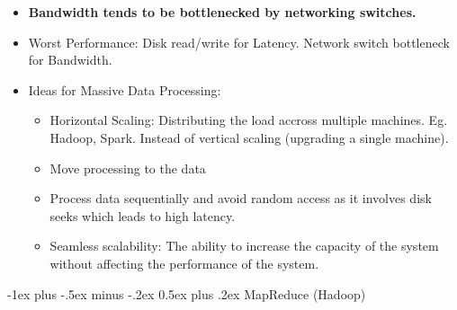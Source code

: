\documentclass[10pt, landscape]{article}
\makeatletter
\renewcommand{\section}{\@startsection{section}{1}{0mm}%
  {-1ex plus -.5ex minus -.2ex}%
  {0.5ex plus .2ex}%
{\normalfont\large\bfseries}}
\makeatother
\begin{document}
\begin{multicols*}{4}
\begin{itemize}
    \item \textbf{Bandwidth tends to be bottlenecked by networking switches.}
    \item Worst Performance: Disk read/write for Latency. Network switch bottleneck for Bandwidth.
    \item Ideas for Massive Data Processing:
    \begin{itemize}
      \item Horizontal Scaling: Distributing the load accross multiple machines. Eg. Hadoop, Spark. Instead of vertical scaling (upgrading a single machine).
      \item Move processing to the data
      \item Process data sequentially and avoid random access as it involves disk seeks which leads to high latency.
      \item Seamless scalability: The ability to increase the capacity of the system without affecting the performance of the system.
    \end{itemize}
  \end{itemize}

  \section{MapReduce (Hadoop)}


\end{multicols*}
\end{document}

